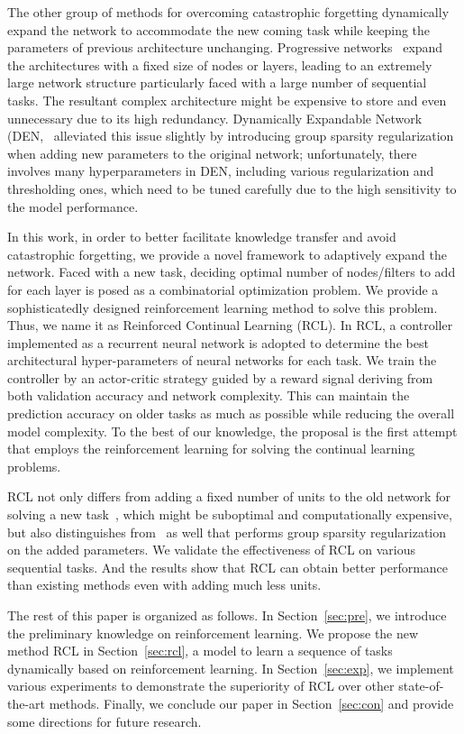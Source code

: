\documentclass{article}
\begin{document}
The other group of methods for overcoming catastrophic forgetting dynamically expand the network to accommodate the new coming task while keeping the parameters of previous architecture unchanging. Progressive networks~\cite{rusu1} expand the architectures with a fixed size of nodes or layers, leading to an extremely large network structure particularly faced with a large number of sequential tasks. The resultant complex architecture might be expensive to store and even unnecessary due to its high redundancy. Dynamically Expandable Network (DEN,~\cite{yoon1} alleviated this issue slightly by introducing group sparsity regularization when adding new parameters to the original network; unfortunately, there involves many hyperparameters in DEN, including various regularization and thresholding ones, which need to be tuned carefully due to the high sensitivity to the model performance.


In this work, in order to  better facilitate knowledge transfer and avoid catastrophic forgetting, we provide a novel framework to adaptively expand the network. Faced with a new task, deciding optimal number of nodes/filters to add for each layer is posed as a combinatorial optimization problem. We provide a sophisticatedly designed reinforcement learning method to solve this problem. Thus, we name it as Reinforced Continual Learning (RCL). In RCL, a controller implemented as a recurrent neural network is adopted to determine the best architectural hyper-parameters of neural networks for each task. We train the controller by an actor-critic strategy guided by a reward signal deriving from both validation accuracy and network complexity. This can maintain the prediction accuracy on older tasks as much as possible while reducing the overall model complexity.  To the best of our knowledge, the proposal is the first attempt that employs the reinforcement learning for solving the continual learning problems.

RCL not only differs from adding a fixed number of units to the old network for solving a new task~\cite{rusu1}, which might be suboptimal and computationally expensive, but also distinguishes from~\cite{yoon1} as well that performs group sparsity regularization on the added  parameters.  We validate the effectiveness of RCL on various sequential tasks. And the results show that RCL can obtain better performance than existing methods even with adding much less units.


The rest of this paper is organized as follows. In Section~\ref{sec:pre}, we introduce the preliminary knowledge on reinforcement learning. We propose the new method RCL in Section~\ref{sec:rcl}, a model to learn a sequence of tasks dynamically based on reinforcement learning. In Section~\ref{sec:exp}, we implement various experiments to demonstrate the superiority of  RCL over other state-of-the-art methods. Finally, we conclude our paper in Section~\ref{sec:con} and provide some directions for future research.
\end{document}
